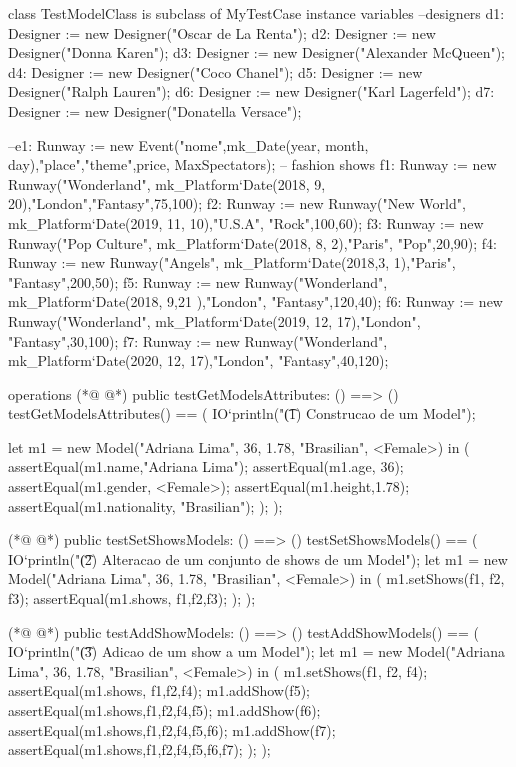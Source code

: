 \begin{vdmpp}[breaklines=true]
class TestModelClass is subclass of MyTestCase
instance variables
 --designers
 d1: Designer := new Designer("Oscar de La Renta");
 d2: Designer := new Designer("Donna Karen");
 d3: Designer := new Designer("Alexander McQueen");
 d4: Designer := new Designer("Coco Chanel");
 d5: Designer := new Designer("Ralph Lauren");
 d6: Designer := new Designer("Karl Lagerfeld");
 d7: Designer := new Designer("Donatella Versace");
 
 --e1: Runway := new Event("nome",mk_Date(year, month, day),"place","theme",price, MaxSpectators);
 -- fashion shows
 f1: Runway := new Runway("Wonderland", mk_Platform`Date(2018, 9, 20),"London","Fantasy",75,100);
 f2: Runway := new Runway("New World", mk_Platform`Date(2019, 11, 10),"U.S.A", "Rock",100,60);
 f3: Runway := new Runway("Pop Culture", mk_Platform`Date(2018, 8, 2),"Paris", "Pop",20,90);
 f4: Runway := new Runway("Angels", mk_Platform`Date(2018,3, 1),"Paris", "Fantasy",200,50);
 f5: Runway := new Runway("Wonderland", mk_Platform`Date(2018, 9,21 ),"London", "Fantasy",120,40);
 f6: Runway := new Runway("Wonderland", mk_Platform`Date(2019, 12, 17),"London", "Fantasy",30,100);
 f7: Runway := new Runway("Wonderland", mk_Platform`Date(2020, 12, 17),"London", "Fantasy",40,120);
 
operations
(*@
\label{testGetModelsAttributes:23}
@*)
 public testGetModelsAttributes: () ==> ()
 testGetModelsAttributes() == (
    IO`println("\t (1) Construcao de um Model");
   
    let m1 = new Model("Adriana Lima", 36, 1.78, "Brasilian", <Female>) in (
   assertEqual(m1.name,"Adriana Lima");
   assertEqual(m1.age, 36);
   assertEqual(m1.gender, <Female>);
   assertEqual(m1.height,1.78);
   assertEqual(m1.nationality, "Brasilian");
   );
 );
 
(*@
\label{testSetShowsModels:36}
@*)
 public testSetShowsModels: () ==> ()
 testSetShowsModels() == (
  IO`println("\t (2) Alteracao de um conjunto de shows de um Model");
    let m1 = new Model("Adriana Lima", 36, 1.78, "Brasilian", <Female>) in (
   m1.setShows({f1, f2, f3});
   assertEqual(m1.shows, {f1,f2,f3});
   );
 ); 
 
(*@
\label{testAddShowModels:45}
@*)
 public testAddShowModels: () ==> ()
 testAddShowModels() == (
    IO`println("\t (3) Adicao de um show a um Model");
    let m1 = new Model("Adriana Lima", 36, 1.78, "Brasilian", <Female>) in (
   m1.setShows({f1, f2, f4});
   assertEqual(m1.shows, {f1,f2,f4});
   m1.addShow(f5);
   assertEqual(m1.shows,{f1,f2,f4,f5});
   m1.addShow(f6);
   assertEqual(m1.shows,{f1,f2,f4,f5,f6});
   m1.addShow(f7);
   assertEqual(m1.shows,{f1,f2,f4,f5,f6,f7});
   );
 ); 
 

\end{vdmpp}
